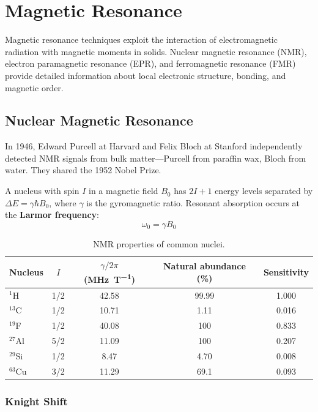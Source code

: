 \chapter{Magnetic Resonance}

Magnetic resonance techniques exploit the interaction of electromagnetic radiation with magnetic moments in solids. Nuclear magnetic resonance (NMR), electron paramagnetic resonance (EPR), and ferromagnetic resonance (FMR) provide detailed information about local electronic structure, bonding, and magnetic order.

\section{Nuclear Magnetic Resonance}

In 1946, Edward Purcell at Harvard and Felix Bloch at Stanford independently detected NMR signals from bulk matter---Purcell from paraffin wax, Bloch from water. They shared the 1952 Nobel Prize.

A nucleus with spin $I$ in a magnetic field $B_0$ has $2I+1$ energy levels separated by $\Delta E = \gamma\hbar B_0$, where $\gamma$ is the gyromagnetic ratio. Resonant absorption occurs at the \textbf{Larmor frequency}:
\begin{equation}
  \omega_0 = \gamma B_0
\end{equation}

\begin{table}[H]
\centering
\caption{NMR properties of common nuclei.}
\label{tab:nmr_nuclei}
\begin{tabular}{@{}lSSSS@{}}
\toprule
Nucleus & {$I$} & {$\gamma/2\pi$ (\si{\mega\hertz\per\tesla})} & {Natural abundance (\%)} & {Sensitivity} \\
\midrule
$^1$H  & 1/2 & 42.58  & 99.99 & 1.000 \\
$^{13}$C & 1/2 & 10.71 & 1.11  & 0.016 \\
$^{19}$F & 1/2 & 40.08 & 100   & 0.833 \\
$^{27}$Al & 5/2 & 11.09 & 100  & 0.207 \\
$^{29}$Si & 1/2 & 8.47 & 4.70  & 0.008 \\
$^{63}$Cu & 3/2 & 11.29 & 69.1 & 0.093 \\
\bottomrule
\end{tabular}
\end{table}

\subsection{Knight Shift}

